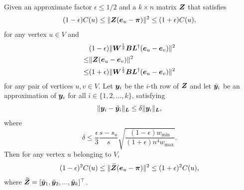 \documentclass[journal]{IEEEtran}
\begin{document}
\begin{lemma}\label{lem:error1}
    Given an approximate factor \(\epsilon \le 1/2\) and a \(k\times n\) matrix \(\boldsymbol{Z}\) that satisfies
    \[
        (1-\epsilon) C(u)
        \leq
        \|\boldsymbol{Z} (\boldsymbol{e}_{u} - \boldsymbol{\pi})\|^{2}
        \leq
        (1+\epsilon)  C(u),
    \]
    for any vertex \(u\in V\) and
    \begin{align*}
             & (1-\epsilon) \|\boldsymbol{W}^{\frac{1}{2}} \boldsymbol{B} \boldsymbol{L}^{\dagger} (\boldsymbol{e}_u-\boldsymbol{e}_v)\|^2 \\
        \leq &
        \|\boldsymbol{Z} (\boldsymbol{e}_u - \boldsymbol{e}_v)\|^2                                                      \\
        \leq &
        (1+\epsilon) \|\boldsymbol{W}^{\frac{1}{2}} \boldsymbol{B} \boldsymbol{L}^{\dagger} (\boldsymbol{e}_u-\boldsymbol{e}_v)\|^2
    \end{align*}
    for any pair of vertices \(u,v \in V\).
    Let \(\boldsymbol{y}_i\) be the \(i\)-th row of \(\boldsymbol{Z}\) and let \(\tilde{\boldsymbol{y}}_i\) be an approximation of \(\boldsymbol{y}_i\) for all \(i \in \{1,2,...,k\}\), satisfying
    \begin{equation}\label{EE13} \|\boldsymbol{y}_i-\tilde{\boldsymbol{y}}_i\|_{\boldsymbol{L}}\le\delta
        \|\boldsymbol{y}_{i}\|_{\boldsymbol{L}},
    \end{equation}
    where
    \begin{equation}\label{EE14}
        \delta \leq  \frac{\epsilon }{3} \frac{s-s_u}{s}
        \sqrt{\frac{(1-\epsilon) w_{\min}}{(1+\epsilon) n^4 w_{\max}}}.
    \end{equation}
    Then for any vertex \(u\) belonging to \(V\),
    \begin{align}
        \label{EE15}
        (1 - \epsilon)^2  C(u)
        \leq
        \|\widetilde{\boldsymbol{Z}}  (\boldsymbol{e}_{u} - \boldsymbol{\pi})\|^2
        \leq
        (1 + \epsilon)^2  C(u),
    \end{align}
    where \(\widetilde{\boldsymbol{Z}} = [\tilde{\boldsymbol{y}}_1, \tilde{\boldsymbol{y}}_2, ..., \tilde{\boldsymbol{y}}_k]^\top\).
\end{lemma}
\end{document}

